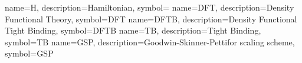 {name={H}, %
 description={Hamiltonian}, %
 symbol={\hamiltonian} %
}
{name={DFT}, %
 description={Density Functional Theory}, %
 symbol={DFT} %
}
{name={DFTB}, %
 description={Density Functional Tight Binding}, %
 symbol={DFTB} %
}
{name={TB}, %
 description={Tight Binding}, %
 symbol={TB} %
}
{name={GSP}, %
 description={Goodwin-Skinner-Pettifor scaling scheme}, %
 symbol={GSP} %
}